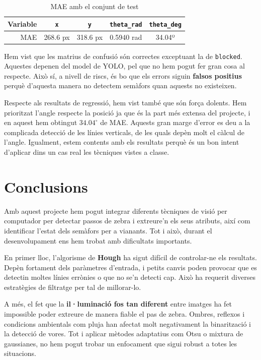 \documentclass[10pt,a4paper,twocolumn,twoside]{article}
\begin{document}
\begin{table}[!h]
\raggedright
\begin{tabular}{r|cccc}
Variable  & \texttt{x} & \texttt{y} & \texttt{theta\_rad} &  \texttt{theta\_deg} \\
\hline
MAE & 268.6 px & 318.6 px & 0.5940 rad & 34.04º\\
\end{tabular}
\caption{MAE amb el conjunt de test}
\label{t:raonstrigonometriques}
\end{table}

Hem vist que les matrius de confusió són correctes exceptuant la de \texttt{blocked}. Aquestes depenen del model de YOLO, pel que no hem pogut fer gran cosa al respecte. Això sí, a nivell de riscs, és bo que els errors siguin \textbf{falsos positius} perquè d'aquesta manera no detectem semàfors quan aquests no existeixen.

Respecte als resultats de regressió, hem vist també que són força dolents. Hem prioritzat l'angle respecte la posició ja que és la part més extensa del projecte, i en aquest hem obtingut $34.04^\circ$ de MAE. Aquests gran marge d'error es deu a la complicada detecció de les línies verticals, de les quals depèn molt el càlcul de l'angle. Igualment, estem contents amb els resultats perquè és un bon intent d'aplicar dins un cas real les tècniques vistes a classe.

\section{Conclusions}

Amb aquest projecte hem pogut integrar diferents tècniques de visió per computador per detectar passos de zebra i extreure’n els seus atributs, així com identificar l’estat dels semàfors per a vianants. Tot i això, durant el desenvolupament ens hem trobat amb dificultats importants.

En primer lloc, l’algorisme de \textbf{Hough} ha sigut difícil de controlar-ne els resultats. Depèn fortament dels paràmetres d’entrada, i petits canvis poden provocar que es detectin moltes línies errònies o que no se’n detecti cap. Això ha requerit diverses estratègies de filtratge per tal de millorar-lo.

A més, el fet que la \textbf{il·luminació fos tan diferent} entre imatges ha fet impossible poder extreure de manera fiable el pas de zebra. Ombres, reflexos i condicions ambientals com pluja han afectat molt negativament la binarització i la detecció de vores. Tot i aplicar mètodes adaptatius com Otsu o mixtura de gaussianes, no hem pogut trobar un enfocament que sigui robust a totes les situacions.
\end{document}
